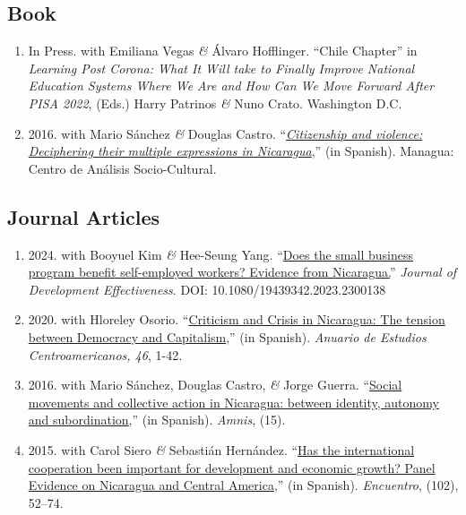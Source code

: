 \documentclass[a4paper, 10pt]{article}
\begin{document}
\subsection*{Book}

\begin{enumerate}[leftmargin=10pt, label={}, itemindent=-10pt, nosep]
\item In Press. with Emiliana Vegas \textit{\&} Álvaro Hofflinger. ``Chile
Chapter'' in \textit{Learning Post Corona: What It Will take to Finally Improve
National Education Systems Where We Are and How Can We Move Forward After PISA
2022}, (Eds.) Harry Patrinos \textit{\&} Nuno Crato. Washington D.C.
\item 2016. with Mario Sánchez \textit{\&} Douglas Castro. ``\emph{\href{http://biblioteca.clacso.edu.ar/Nicaragua/casc-uca/20150313124733/Ciudadania-y-violencia.pdf}{Citizenship and violence: Deciphering their multiple expressions in Nicaragua}},'' (in Spanish). Managua: Centro de Análisis Socio-Cultural.
\end{enumerate}

\subsection*{Journal Articles}

\begin{enumerate}[leftmargin=10pt, label={}, itemindent=-10pt, nosep]
\item 2024. with Booyuel Kim \textit{\&} Hee-Seung Yang. ``\href{https://www.tandfonline.com/doi/full/10.1080/19439342.2023.2300138}{Does the small business
  program benefit self-employed workers? Evidence from Nicaragua.}''
  \textit{Journal of Development Effectiveness}. DOI: 10.1080/19439342.2023.2300138

\item 2020. with Hloreley Osorio. ``\href{https://revistas.ucr.ac.cr/index.php/anuario/article/view/45081/44860}{Criticism and Crisis in Nicaragua: The tension between Democracy and Capitalism},'' (in Spanish). \emph{Anuario de Estudios Centroamericanos, 46}, 1-42.

\item 2016. with Mario Sánchez, Douglas Castro, \textit{\&} Jorge Guerra. ``\href{https://amnis.revues.org/2813}{Social movements and collective action in Nicaragua: between identity, autonomy and subordination},'' (in Spanish). \emph{Amnis}, (15).

\item 2015. with Carol Siero \textit{\&} Sebastián Hernández. ``\href{http://www.uca.edu.ni/2/images/Revista-Encuentro/Revistas/e102/art-5.pdf}{Has the international cooperation been important for development and economic growth? Panel Evidence on Nicaragua and Central America},'' (in Spanish). \emph{Encuentro}, (102), 52--74.
\end{enumerate}
\end{document}
